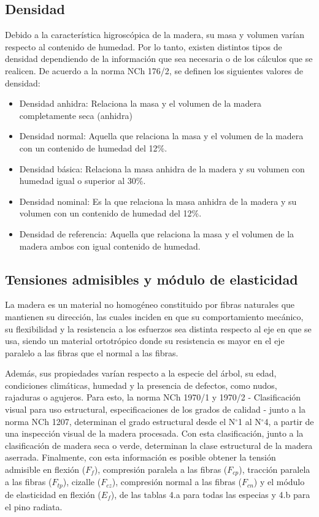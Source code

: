 \subsection{Densidad}
Debido a la característica higroscópica de la madera, su masa y volumen varían respecto al contenido de humedad. Por lo tanto, existen distintos tipos de densidad dependiendo de la información que sea necesaria o de los cálculos que se realicen. De acuerdo a la norma NCh 176/2, se definen los siguientes valores de densidad:
\begin{itemize}
	\item Densidad anhidra: Relaciona la masa y el volumen de la madera completamente seca (anhidra)
	\item Densidad normal: Aquella que relaciona la masa y el volumen de la madera con un contenido de humedad del 12\%.
	\item Densidad básica: Relaciona la masa anhidra de la madera y su volumen con humedad igual o superior al 30\%.
	\item Densidad nominal: Es la que relaciona la masa anhidra de la madera y su volumen con un contenido de humedad del 12\%.
	\item Densidad de referencia: Aquella que relaciona la masa y el volumen de la madera ambos con igual contenido de humedad.
\end{itemize}

\subsection{Tensiones admisibles y módulo de elasticidad}
La madera es un material no homogéneo constituido por fibras naturales que mantienen su dirección, las cuales inciden en que su comportamiento mecánico, su flexibilidad y la resistencia a los esfuerzos sea distinta respecto al eje en que se usa, siendo un material ortotrópico donde su resistencia es mayor en el eje paralelo a las fibras que el normal a las fibras.

Además, sus propiedades varían respecto a la especie del árbol, su edad, condiciones climáticas, humedad y la presencia de defectos, como nudos, rajaduras o agujeros. Para esto, la norma NCh 1970/1 y 1970/2 - Clasificación visual para uso estructural, especificaciones de los grados de calidad - junto a la norma NCh 1207, determinan el grado estructural desde el N$^\circ$1 al N$^\circ$4, a partir de una inspección visual de la madera procesada. Con esta clasificación, junto a la clasificación de madera seca o verde, determinan la clase estructural de la madera aserrada. Finalmente, con esta información es posible obtener la tensión admisible en flexión ($F_f$), compresión paralela a las fibras ($F_{cp}$), tracción paralela a las fibras ($F_{tp}$), cizalle ($F_{cz}$), compresión normal a las fibras ($F_{cn}$) y el módulo de elasticidad en flexión ($E_f$), de las tablas 4.a para todas las especias y 4.b para el pino radiata.

